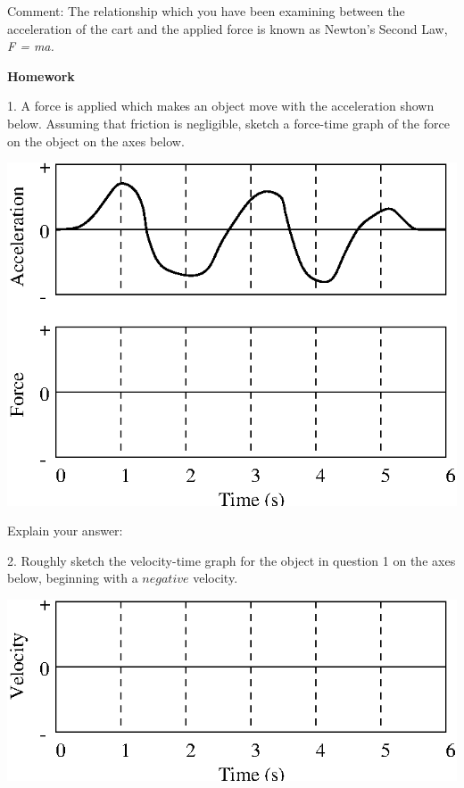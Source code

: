 Comment: The relationship which you have been examining between the acceleration of the cart and the applied force is known as Newton's Second Law, \textit{F = ma.}
\newpage

\textbf{Homework} 

1. A force is applied which makes an object move with the acceleration shown
below. Assuming that friction is negligible, sketch a force-time graph of the
force on the object on the axes below.

\vspace{0.3cm}
{\par\centering \includegraphics{force1_fig6.eps} \par}
\vspace{0.3cm}

Explain your answer:
\vspace{10mm}

2. Roughly sketch the velocity-time graph for the object in question 1 on the
axes below, beginning with a $negative$ velocity.

\vspace{0.3cm}
{\par\centering \includegraphics{force1_fig7.eps} \par}
\vspace{0.3cm}

